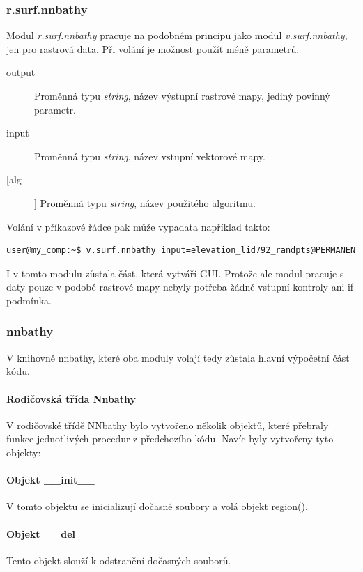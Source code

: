 \documentclass[12pt,a4paper]{article}
\begin{document}
\subsubsection{r.surf.nnbathy}
Modul \textit{r.surf.nnbathy} pracuje na podobném principu jako modul \textit{v.surf.nnbathy}, jen pro rastrová data. Při volání je možnost použít méně parametrů.
\begin{description}
\item[output] Proměnná typu \textit{string}, název výstupní rastrové mapy, jediný povinný parametr.
\item[input] Proměnná typu \textit{string}, název vstupní vektorové mapy.
\item[[alg]] Proměnná typu \textit{string}, název použitého algoritmu.
\end{description}

Volání v příkazové řádce pak může vypadata například takto:
\begin{lstlisting}[language=bash,caption={bash version}]
user@my_comp:~$ v.surf.nnbathy input=elevation_lid792_randpts@PERMANENT output=raster_map zcolumn=value alg=nn
\end{lstlisting}

I v tomto modulu zůstala část, která vytváří GUI. Protože ale modul pracuje s daty pouze v podobě rastrové mapy nebyly potřeba žádně vstupní kontroly ani if podmínka.



\subsubsection{nnbathy}
V knihovně nnbathy, které oba moduly volají tedy zůstala hlavní výpočetní část kódu. 

\paragraph{Rodičovská třída Nnbathy} V rodičovské třídě NNbathy bylo vytvořeno několik objektů, které přebraly funkce jednotlivých procedur z předchozího kódu. Navíc byly vytvořeny tyto objekty:

\paragraph{Objekt \_\_init\_\_}
V tomto objektu se inicializují dočasné soubory a volá objekt region().


\paragraph{Objekt \_\_del\_\_}
Tento objekt slouží k odstranění dočasných souborů.
\end{document}
